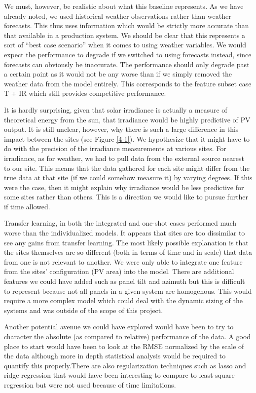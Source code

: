 \documentclass[11pt, fullpage,letterpaper]{article}
\begin{document}
We must, however, be realistic about what this baseline represents. As we have already noted, we used historical weather observations rather than weather forecasts. This thus uses information which would be strictly more accurate than that available in a production system. We should be clear that this represents a sort of “best case scenario” when it comes to using weather variables. We would expect the performance to degrade if we switched to using forecasts instead, since forecasts can obviously be inaccurate. The performance should only degrade past a certain point as it would not be any worse than if we simply removed the weather data from the model entirely. This corresponds to the feature subset case T + IR which still provides competitive performance.

It is hardly surprising, given that solar irradiance is actually a measure of theoretical energy from the sun, that irradiance would be highly predictive of PV output. It is still unclear, however, why there is such a large difference in this impact between the sites (see Figure \ref{4-1}). We hypothesize that it might have to do with the precision of the irradiance measurements at various sites. For irradiance, as for weather, we had to pull data from the external source nearest to our site. This means that the data gathered for each site might differ from the true data at that site (if we could somehow measure it) by varying degrees. If this were the case, then it might explain why irradiance would be less predictive for some sites rather than others. This is a direction we would like to pursue further if time allowed.

Transfer learning, in both the integrated and one-shot cases performed much worse than the individualized models. It appears that sites are too dissimilar to see any gains from transfer learning. The most likely possible explanation is that the sites themselves are so different (both in terms of time and in scale) that data from one is not relevant to another. We were only able to integrate one feature from the sites’ configuration (PV area) into the model. There are additional features we could have added such as panel tilt and azimuth but this is difficult to represent because not all panels in a given system are homogenous. This would require a more complex model which could deal with the dynamic sizing of the systems  and was outside of the scope of this project.
    
Another potential avenue we could have explored would have been to try to character the absolute (as compared to relative) performance of the data. A good place to start would have been to look at the RMSE normalized by the scale of the data although more in depth statistical analysis would be required to quantify this properly.There are also regularization techniques such as lasso and ridge regression that would have been interesting to compare to least-square regression but were not used because of time limitations.
    
\end{document}
